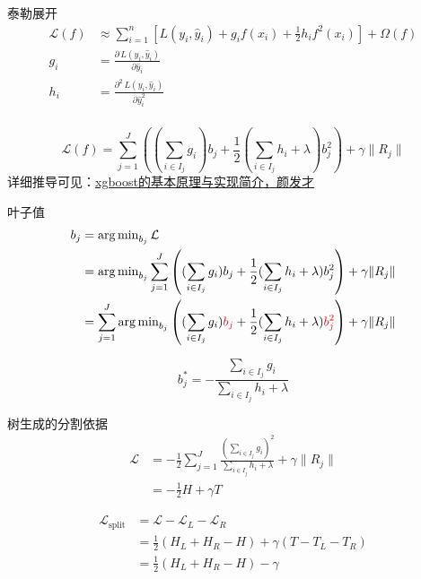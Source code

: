\begin{frame}{泰勒展开}
    \begin{align*}
        \mathcal{L}(f) &\approx \sum_{i=1}^n \left [ L(y_i, \hat{y}_i) + g_i f(x_i) + \frac{1}{2} h_i f^2(x_i) \right ] + \Omega(f) \\
        g_i &= \frac{\partial \, L(y_i, \hat{y}_i)}{\partial \hat{y}_i} \\
        h_i &= \frac{\partial^2 \, L(y_i, \hat{y}_i)}{\partial \hat{y}^2_i} \\
    \end{align*}

    \begin{equation*}
        \mathcal{L}(f) = \sum_{j=1}^J \left ( ( \sum_{i \in I_j} g_i ) b_j + \frac{1}{2} (\sum_{i \in I_j} h_i + \lambda) b_j^2 \right ) + \gamma \|R_j\|
    \end{equation*}
    {\tiny
    详细推导可见：\href{http://nbviewer.jupyter.org/github/facaiy/book_notes/blob/master/machine_learning/tree/gbdt/xgboost/intro.ipynb}{xgboost的基本原理与实现简介，颜发才}}
\end{frame}

\begin{frame}{叶子值}
    \begin{align*}
        b_j &= \operatorname{arg \, min}_{b_j} \mathcal{L} \\
            &= \operatorname{arg \, min}_{b_j} \sum_{j=1}^J \left ( ( \sum_{i \in I_j} g_i ) b_j + \frac{1}{2} (\sum_{i \in I_j} h_i + \lambda) b_j^2 \right ) + \gamma \|R_j\|  \\
            &= \sum_{j=1}^J \operatorname{arg \, min}_{b_j} \left ( ( \sum_{i \in I_j} g_i ) \textcolor{red}{b_j} + \frac{1}{2} (\sum_{i \in I_j} h_i + \lambda) \textcolor{red}{b_j^2} \right ) + \gamma \|R_j\|
    \end{align*}

    \vfill

    \begin{equation*}
        b^*_j = - \frac{\sum_{i \in I_j} g_i}{\sum_{i \in I_j} h_i + \lambda}
    \end{equation*}
\end{frame}

\begin{frame}{树生成的分割依据}
    \begin{align*}
        \mathcal{L} &= - \frac{1}{2} \sum_{j=1}^J \frac{(\sum_{i \in I_j} g_i)^2}{\sum_{i \in I_j} h_i + \lambda} + \gamma \|R_j\| \\
                    &= - \frac{1}{2} H + \gamma T
    \end{align*}

    \vfill

    \begin{align*}
        \mathcal{L}_{\text{split}} &= \mathcal{L} - \mathcal{L}_L - \mathcal{L}_R \\
                                  &= \frac{1}{2} (H_L + H_R - H) + \gamma (T - T_L - T_R) \\
                                  &= \frac{1}{2} (H_L + H_R - H) - \gamma
    \end{align*}
\end{frame}

